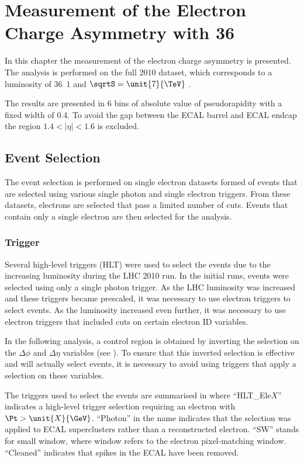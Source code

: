 \chapter[Measurement of the Electron Charge Asymmetry]{Measurement of the Electron Charge Asymmetry with \unit{36}{\invpb} }
\label{chap:analysis}

In this chapter the measurement of the electron charge asymmetry is presented.
The analysis is performed on the full 2010 dataset, which corresponds to a
luminosity of \unit{36.1}{\invpb} and $\sqrtS = \unit{7}{\TeV}$
\cite{asym36,baisini2010electron}.

The results are presented in 6 bins of absolute value of pseudorapidity with a
fixed width of 0.4. To avoid the gap between the ECAL barrel and ECAL endcap the
region $1.4<|\eta|<1.6$ is excluded.

\section{Event Selection}

The event selection is performed on single electron datasets formed of events
that are selected using various single photon and single electron triggers. From
these datasets, electrons are selected that pass a limited number of cuts.
Events that contain only a single electron are then selected for the analysis.

\subsection{Trigger}

Several high-level triggers (HLT) were used to select the events due to the
increasing luminosity during the {LHC} 2010 run.  In the initial runs, events
were selected using only a single photon trigger.  As the {LHC} luminosity was
increased and these triggers became prescaled, it was necessary to use electron
triggers to select events.  As the luminosity increased even further, it was
necessary to use electron triggers that included cuts on certain electron ID
variables.

In the following analysis, a control region is obtained by inverting the
selection on the $\Delta\phi$ and $\Delta\eta$ variables (see
).
To ensure that this inverted selection is effective and will actually
select events, it is necessary to avoid using triggers that apply a selection on
these variables.

The triggers used to select the events are summarised in 
where ``HLT\_Ele$X$'' indicates a high-level trigger selection requiring an
electron with  $\Pt > \unit{X}{\GeV}$.  ``Photon'' in the name indicates that
the selection was applied to ECAL superclusters rather than a reconstructed
electron.  ``SW'' stands for small window, where window refers to the electron
pixel-matching window.  ``Cleaned'' indicates that spikes in the {ECAL} have
been removed.  

